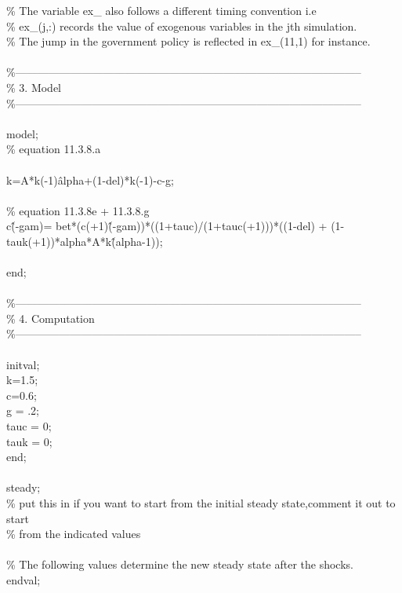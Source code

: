 \documentclass[a4paper,12pt]{scrartcl} %
\begin{document}
\% The variable ex\_ also follows a different timing convention i.e\\
\% ex\_(j,:) records the value of exogenous variables in the jth simulation.\\
\% The jump in the government policy is reflected in ex\_(11,1) for instance.\\
\\
\%-----------------------------------------------------------------------------------------------\\
\% 3. Model\\
\%-----------------------------------------------------------------------------------------------\\
\\
model;\\
\% equation 11.3.8.a\\
\\
k=A*k(-1)\^alpha+(1-del)*k(-1)-c-g;\\
\\
\% equation 11.3.8e + 11.3.8.g\\
c\^(-gam)= bet*(c(+1)\^(-gam))*((1+tauc)/(1+tauc(+1)))*((1-del) + (1-tauk(+1))*alpha*A*k\^(alpha-1));\\
\\
end;\\
\\
\%-----------------------------------------------------------------------------------------------\\
\% 4. Computation\\
\%-----------------------------------------------------------------------------------------------\\
\\
initval;\\
k=1.5;\\
c=0.6;\\
g = .2;\\
tauc = 0;\\
tauk = 0;\\
end;\\
\\
steady;\\
\% put this in if you want to start from the initial steady state,comment it out to start\\
\% from the indicated values\\
\\
\% The following values determine the new steady state after the shocks.\\
endval;\\
\end{document}
